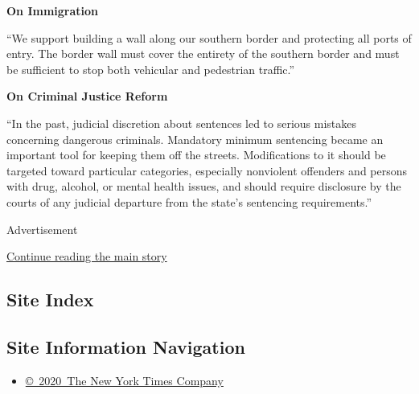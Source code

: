 \textbf{On Immigration}

``We support building a wall along our southern border and protecting
all ports of entry. The border wall must cover the entirety of the
southern border and must be sufficient to stop both vehicular and
pedestrian traffic.''

\textbf{On Criminal Justice Reform}

``In the past, judicial discretion about sentences led to serious
mistakes concerning dangerous criminals. Mandatory minimum sentencing
became an important tool for keeping them off the streets. Modifications
to it should be targeted toward particular categories, especially
nonviolent offenders and persons with drug, alcohol, or mental health
issues, and should require disclosure by the courts of any judicial
departure from the state's sentencing requirements.''

Advertisement

\protect\hyperlink{after-bottom}{Continue reading the main story}

\hypertarget{site-index}{%
\subsection{Site Index}\label{site-index}}

\hypertarget{site-information-navigation}{%
\subsection{Site Information
Navigation}\label{site-information-navigation}}

\begin{itemize}
\tightlist
\item
  \href{https://help.nytimes.com/hc/en-us/articles/115014792127-Copyright-notice}{©~2020~The
  New York Times Company}
\end{itemize}

